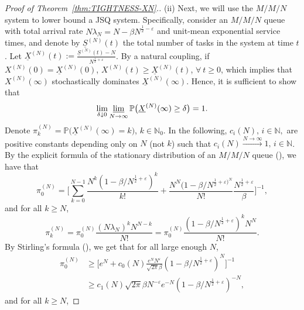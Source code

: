 \documentclass[11pt, reqno]{article}
\numberwithin{equation}{section}
\numberwithin{theorem}{section}
\newcommand\blue[1]{#1}
\newcommand{\N}{\mathbb{N}}                 %
\newcommand{\PP}{\mathbb{P}}  				%
\begin{document}
\begin{proof}[Proof of Theorem~\ref{thm:TIGHTNESS-XN}.]
(ii) \blue{Next, we will use the $M/M/N$ system to lower bound a JSQ system. 
Specifically, consider an $M/M/N$ queue with total arrival rate $N\lambda_N=N-\beta N^{\frac{1}{2}-\varepsilon}$ and unit-mean exponential service times, and denote by $\underline{S}^{(N)}(t)$ the total number of tasks in the system at time $t$. Let $\underline{X}^{(N)}(t):=\frac{\underline{S}^{(N)}(t)-N}{N^{\frac{1}{2}+\varepsilon}}$. By a natural coupling, if $X^{(N)}(0)=\underline{X}^{(N)}(0)$, $X^{(N)}(t)\geq \underline{X}^{(N)}(t)$, $\forall\ t\geq 0$, which implies that $X^{(N)}(\infty)$ stochastically dominates $\underline{X}^{(N)}(\infty)$. Hence, it is sufficient to show that 
\begin{equation}\label{eq:mmn-geq-0}
\lim_{\delta\downarrow0}\varliminf_{N\rightarrow\infty}\PP\big(\underline{X}^{(N)}(\infty)\ge \delta\big)= 1.
\end{equation}
Denote $\pi^{(N)}_k=\PP\big(\underline{X}^{(N)}(\infty)=k\big)$, $k\in\N_0$. In the following, $c_i(N), \, i \in \mathbb{N},$ are positive constants depending only on $N$ (not $k$) such that $c_i(N)\xrightarrow{N\rightarrow\infty}1, \, i \in \mathbb{N}$. By the explicit formula of the stationary distribution of an $M/M/N$ queue (\cite[Section~3.5]{KL75}), we have that 
\begin{equation}\label{eq:pi-0}
    \pi^{(N)}_0=\Big[\sum_{k=0}^{N-1}\frac{N^k(1-\beta/N^{\frac{1}{2}+\varepsilon})^k}{k!}+\frac{N^N(1-\beta/N^{\frac{1}{2}+\varepsilon)^N}}{N!}\frac{N^{\frac{1}{2}+\varepsilon}}{\beta}\Big]^{-1},
\end{equation}
and for all $k\geq N$,
\begin{equation}\label{pi-k}
    \pi^{(N)}_k=\pi^{(N)}_0\frac{(N\lambda_N)^kN^{N-k}}{N!}=\pi^{(N)}_0\frac{(1-\beta/N^{\frac{1}{2}+\varepsilon})^kN^{N}}{N!}.
\end{equation}
By Stirling's formula (\cite[Section~27]{pb12}), we get that for all large enough $N$,
\begin{equation}\label{eq:low-bound-pi-0}
    \begin{split}
        \pi^{(N)}_0&\geq \Big[e^{N}+c_0(N)\frac{e^NN^{\varepsilon}}{\sqrt{2\pi}\beta}(1-\beta/N^{\frac{1}{2}+\varepsilon})^N\Big]^{-1}\\
        &\geq c_1(N)\sqrt{2\pi}\beta N^{-\varepsilon}e^{-N}(1-\beta/N^{\frac{1}{2}+\varepsilon})^{-N},
    \end{split}
\end{equation}
and for all $k\geq N$,
}
\end{proof}
\end{document}
